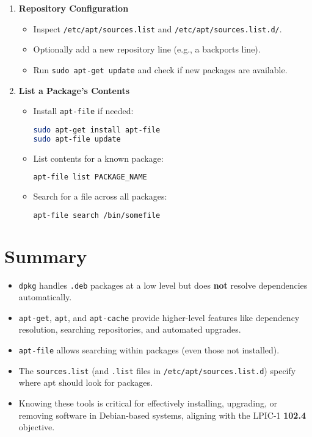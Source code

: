 \documentclass[12pt,a4paper]{report}
\begin{document}
\begin{enumerate}
    \item \textbf{Repository Configuration}
    \begin{itemize}
        \item Inspect \texttt{/etc/apt/sources.list} and \texttt{/etc/apt/sources.list.d/}.
        \item Optionally add a new repository line (e.g., a backports line).
        \item Run \texttt{sudo apt-get update} and check if new packages are available.
    \end{itemize}

    \item \textbf{List a Package’s Contents}
    \begin{itemize}
        \item Install \texttt{apt-file} if needed:
        \begin{lstlisting}[language=bash]
sudo apt-get install apt-file
sudo apt-file update
        \end{lstlisting}
        \item List contents for a known package:
        \begin{lstlisting}[language=bash]
apt-file list PACKAGE_NAME
        \end{lstlisting}
        \item Search for a file across all packages:
        \begin{lstlisting}[language=bash]
apt-file search /bin/somefile
        \end{lstlisting}
    \end{itemize}
\end{enumerate}

\section*{Summary}

\begin{itemize}
    \item \texttt{dpkg} handles \texttt{.deb} packages at a low level but does \textbf{not} resolve dependencies automatically.
    \item \texttt{apt-get}, \texttt{apt}, and \texttt{apt-cache} provide higher-level features like dependency resolution, searching repositories, and automated upgrades.
    \item \texttt{apt-file} allows searching within packages (even those not installed).
    \item The \texttt{sources.list} (and \texttt{.list} files in \texttt{/etc/apt/sources.list.d}) specify where apt should look for packages.
    \item Knowing these tools is critical for effectively installing, upgrading, or removing software in Debian-based systems, aligning with the LPIC-1 \textbf{102.4} objective.
\end{itemize}
\end{document}
